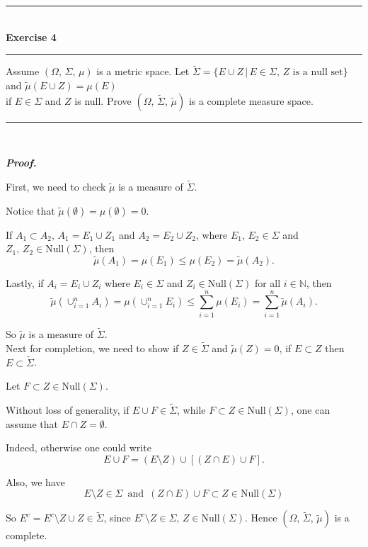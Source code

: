 \documentclass[a4paper,11pt]{article}
\begin{document}

\begin{flushleft}
	\rule[-0.5ex]{17cm}{2pt}\\
		\textbf{Exercise 4}\\
	\rule[1.5ex]{17cm}{0.5pt}
		Assume $(\Omega,\,\Sigma,\,\mu)$ is a metric space. Let $\widetilde{\Sigma} = \{E \cup Z\,|\,E \in \Sigma,\,Z\text{ is a null set}\}$ and $\widetilde{\mu}(E \cup Z) = \mu(E)$\\if $E \in \Sigma$ and $Z$ is null. Prove $(\Omega,\,\widetilde{\Sigma},\,\widetilde{\mu})$ is a complete measure space.
	\rule[1.0ex]{17cm}{0.5pt}\
\end{flushleft}

\textbf{\textit{Proof.}}

First, we need to check $\widetilde{\mu}$ is a measure of $\widetilde{\Sigma}$.

Notice that $\widetilde{\mu}(\emptyset) = \mu(\emptyset) = 0$.

If $A_1 \subset A_2,\,A_1 = E_1 \cup Z_1$ and $A_2 = E_2 \cup Z_2$, where $E_1,\,E_2 \in \Sigma$ and $Z_1,\,Z_2 \in \text{Null}(\Sigma)$, then
	$$\widetilde{\mu}(A_1) = \mu(E_1)
	\leq \mu(E_2) = \widetilde{\mu}(A_2).$$

Lastly, if $A_i = E_i \cup Z_i$ where $E_i \in \Sigma$ and $Z_i \in \text{Null}(\Sigma)$ for all $i \in \mathbb{N}$, then
	$$\widetilde{\mu}\left(\cup_{i = 1}^nA_i\right)
	= \mu(\cup_{i=1}^n E_i)
	\leq \sum_{i=1}^n \mu(E_i)
	= \sum_{i=1}^n \widetilde{\mu}(A_i).$$

So $\widetilde{\mu}$ is a measure of $\widetilde{\Sigma}$.\\

Next for completion, we need to show if $Z \in \widetilde{\Sigma}$ and $\widetilde{\mu}(Z) = 0$, if $E \subset Z$ then $E \subset \widetilde{\Sigma}$.

Let $F \subset Z \in \text{Null}(\Sigma)$.

Without loss of generality, if $E \cup F \in \widetilde{\Sigma}$, while $F \subset Z \in \text{Null}(\Sigma)$, one can assume that $E \cap Z = \emptyset$.

Indeed, otherwise one could write
	$$E \cup F
	= (E \setminus Z) \cup [(Z \cap E) \cup F].$$

Also, we have
	$$E \setminus Z \in \Sigma\,\text{ and }\,
	(Z \cap E) \cup F \subset Z \in \text{Null}(\Sigma)$$

So $E^c = E^c \setminus Z \cup Z \in \widetilde{\Sigma}$, since $E^c \setminus Z \in \Sigma,\,Z \in \text{Null}(\Sigma)$. Hence $(\Omega,\,\widetilde{\Sigma},\,\widetilde{\mu})$ is a complete.


			
\end{document}
